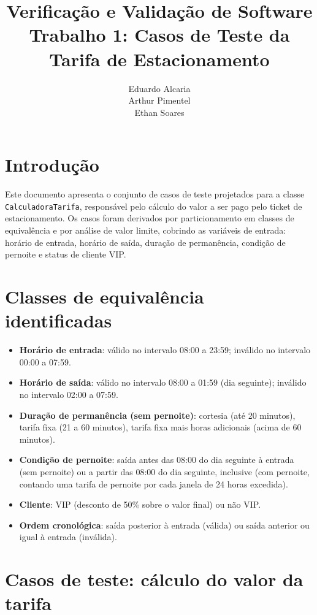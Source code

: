 \documentclass[11pt,a4paper]{article}
\title{Verificação e Validação de Software \\ \large Trabalho 1: Casos de Teste da Tarifa de Estacionamento}
\author{Eduardo Alcaria \\ Arthur Pimentel \\ Ethan Soares}
\date{}
\begin{document}
\maketitle
\vspace{-2.5em}

\section*{Introdução}

Este documento apresenta o conjunto de casos de teste projetados para a classe
\texttt{CalculadoraTarifa}, responsável pelo cálculo do valor a ser pago pelo
ticket de estacionamento. Os casos foram derivados por particionamento em
classes de equivalência e por análise de valor limite, cobrindo as
variáveis de entrada: horário de entrada, horário de saída, duração de
permanência, condição de pernoite e status de cliente VIP.

\section*{Classes de equivalência identificadas}

\begin{itemize}
  \item \textbf{Horário de entrada}: válido no intervalo 08:00 a 23:59; inválido no
        intervalo 00:00 a 07:59.
  \item \textbf{Horário de saída}: válido no intervalo 08:00 a 01:59 (dia seguinte);
        inválido no intervalo 02:00 a 07:59.
  \item \textbf{Duração de permanência (sem pernoite)}: cortesia (até 20 minutos),
        tarifa fixa (21 a 60 minutos), tarifa fixa mais horas adicionais (acima de 60
        minutos).
  \item \textbf{Condição de pernoite}: saída antes das 08:00 do dia seguinte à
        entrada (sem pernoite) ou a partir das 08:00 do dia seguinte, inclusive
        (com pernoite, contando uma tarifa de pernoite por cada janela de 24 horas
        excedida).
  \item \textbf{Cliente}: VIP (desconto de 50\% sobre o valor final) ou não VIP.
  \item \textbf{Ordem cronológica}: saída posterior à entrada (válida) ou saída
        anterior ou igual à entrada (inválida).
\end{itemize}

\section*{Casos de teste: cálculo do valor da tarifa}
\end{document}
